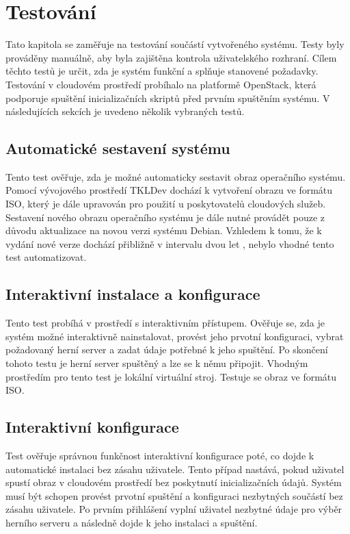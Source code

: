 \chapter{Testování}

Tato kapitola se zaměřuje na testování součástí vytvořeného systému. Testy byly prováděny
manuálně, aby byla zajištěna kontrola uživatelského rozhraní. Cílem těchto testů je určit,
zda je systém funkční a splňuje stanovené požadavky.
Testování v cloudovém prostředí probíhalo na platformě OpenStack, která podporuje spuštění
inicializačních skriptů před prvním spuštěním systému.
V následujících sekcích je uvedeno několik
vybraných testů.

\section{Automatické sestavení systému}

Tento test ověřuje, zda je možné automaticky sestavit obraz operačního systému. Pomocí vývojového prostředí
TKLDev dochází k vytvoření obrazu ve formátu ISO, který je dále upravován pro použití u poskytovatelů
cloudových služeb. Sestavení nového obrazu operačního systému je dále nutné provádět pouze z důvodu
aktualizace na novou verzi systému Debian. Vzhledem k tomu, že k vydání nové verze dochází přibližně
v intervalu dvou let \cite{debian_release_stats}, nebylo vhodné tento test automatizovat.

\section{Interaktivní instalace a konfigurace}

Tento test probíhá v prostředí s interaktivním přístupem. Ověřuje se, zda je systém možné interaktivně nainstalovat, provést jeho
prvotní konfiguraci, vybrat požadovaný herní server a zadat údaje potřebné k jeho spuštění. Po skončení tohoto testu
je herní server spuštěný a lze se k němu připojit. Vhodným prostředím pro tento test je lokální virtuální stroj.
Testuje se obraz ve formátu ISO.

\section{Interaktivní konfigurace}

Test ověřuje správnou funkčnost interaktivní konfigurace poté, co dojde k automatické instalaci bez zásahu uživatele.
Tento případ nastává, pokud uživatel spustí obraz v cloudovém prostředí bez poskytnutí inicializačních údajů. Systém
musí být schopen provést prvotní spuštění a konfiguraci nezbytných součástí bez zásahu uživatele.
Po prvním přihlášení vyplní uživatel nezbytné údaje pro výběr herního serveru a následně dojde k jeho instalaci a spuštění.

